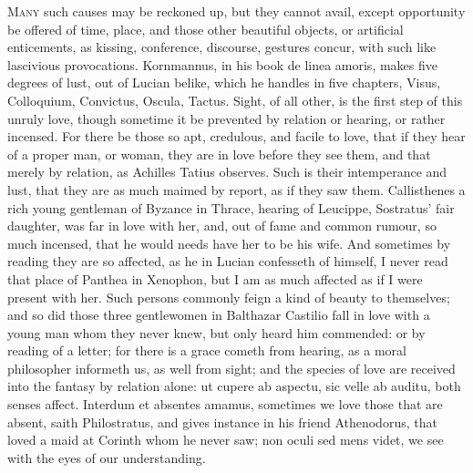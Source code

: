 \lettrine{M}{any} such causes may be reckoned up, but they cannot avail, except
opportunity be offered of time, place, and those other beautiful
objects, or artificial enticements, as kissing, conference, discourse,
gestures concur, with such like lascivious provocations. Kornmannus, in
his book de linea amoris, makes five degrees of lust, out of
Lucian belike, which he handles in five chapters, Visus,
Colloquium, Convictus, Oscula, Tactus. Sight, of all other, is
the first step of this unruly love, though sometime it be prevented by
relation or hearing, or rather incensed. For there be those so apt,
credulous, and facile to love, that if they hear of a proper man, or
woman, they are in love before they see them, and that merely by
relation, as Achilles Tatius observes. Such is their intemperance
and lust, that they are as much maimed by report, as if they saw them.
Callisthenes a rich young gentleman of Byzance in Thrace, hearing of
Leucippe, Sostratus' fair daughter, was far in love with her,
and, out of fame and common rumour, so much incensed, that he would
needs have her to be his wife. And sometimes by reading they are so
affected, as he in Lucian confesseth of himself, I never read
that place of Panthea in Xenophon, but I am as much affected as if I
were present with her. Such persons commonly feign a kind of
beauty to themselves; and so did those three gentlewomen in
Balthazar Castilio fall in love with a young man whom they never
knew, but only heard him commended: or by reading of a letter; for
there is a grace cometh from hearing,  as a moral philosopher
informeth us, as well from sight; and the species of love are received
into the fantasy by relation alone: ut cupere ab aspectu, sic
velle ab auditu, both senses affect. Interdum et absentes amamus,
sometimes we love those that are absent, saith Philostratus, and gives
instance in his friend Athenodorus, that loved a maid at Corinth whom
he never saw; non oculi sed mens videt, we see with the eyes of our
understanding.

